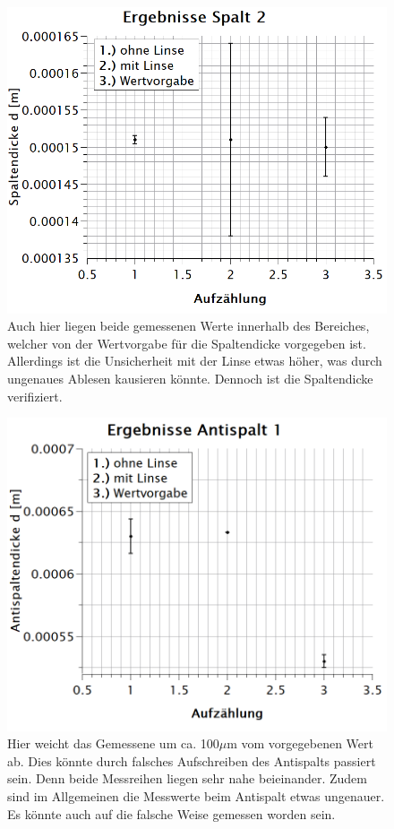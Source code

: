 \begin{figure}
\centering
\includegraphics[width=\textwidth]{Bilder/ergebnisse_spalt2.png} 
\caption[Ergebnisse Spalt 2]{Auch hier liegen beide gemessenen Werte innerhalb des Bereiches, welcher von der Wertvorgabe für die Spaltendicke vorgegeben ist. Allerdings ist die Unsicherheit mit der Linse etwas höher, was durch ungenaues Ablesen kausieren könnte. Dennoch ist die Spaltendicke verifiziert.}
\label{fig:ergSpalt2}
\end{figure}
\newpage
\begin{figure}
\centering
\includegraphics[width=\textwidth]{Bilder/ergebnisse_antispalt1.png} 
\caption[Ergebnisse Antispalt 1]{Hier weicht das Gemessene um ca. 100$\mu$m vom vorgegebenen Wert ab. Dies könnte durch falsches Aufschreiben des Antispalts passiert sein. Denn beide Messreihen liegen sehr nahe beieinander. Zudem sind im Allgemeinen die Messwerte beim Antispalt etwas ungenauer. Es könnte auch auf die falsche Weise gemessen worden sein.}
\label{fig:ergAntispalt1}
\end{figure}

